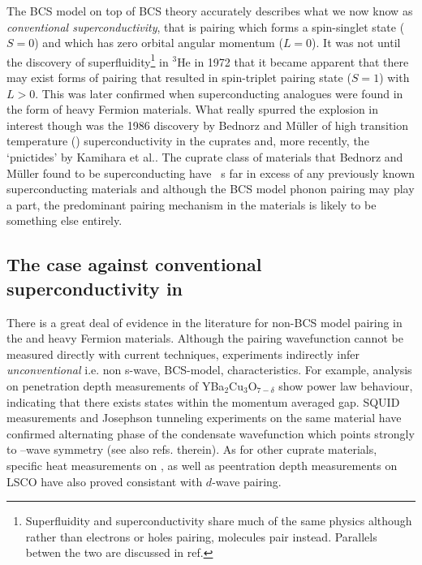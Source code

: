 The BCS model on top of BCS theory accurately describes what we now know as \textit{conventional superconductivity}, that is pairing which forms a spin-singlet state ($S=0$) and which has zero orbital angular momentum ($L=0$). It was not until the discovery of superfluidity\footnote{Superfluidity and superconductivity share much of the same physics although rather than electrons or holes pairing, molecules pair instead. Parallels betwen the two are discussed in ref.\cite{Annett2010}} in $^3$He in 1972\cite{Osheroff1972} that it became apparent that there may exist forms of pairing that resulted in spin-triplet pairing state ($S=1$) with $L>0$. This was later confirmed when superconducting analogues were found in the form of heavy Fermion materials. What really spurred the explosion in interest though was the 1986 discovery by Bednorz and M\"uller\cite{Bednorz} of high transition temperature (\Tc) superconductivity in the cuprates and, more recently, the `pnictides' by Kamihara et al.\cite{Kamihara2008}. The cuprate class of materials that Bednorz and M\"uller found to be superconducting have \Tc~s far in excess of any previously known superconducting materials and although the BCS model phonon pairing may play a part, the predominant pairing mechanism in the \highTc materials is likely to be something else entirely.

\subsection{The case against conventional superconductivity in \highTc}

There is a great deal of evidence in the literature for non-BCS model pairing in the \highTc and heavy Fermion materials. Although the pairing wavefunction cannot be measured directly with current techniques, experiments indirectly infer \textit{unconventional} i.e. non s-wave, BCS-model, characteristics. For example, analysis on penetration depth measurements of YBa$_2$Cu$_3$O$_{7-\delta}$ show power law behaviour\cite{Annett1991}, indicating that there exists states within the momentum averaged gap. SQUID measurements and Josephson tunneling experiments on the same material have confirmed alternating phase of the condensate wavefunction which points strongly to \DxTwoyTwo--wave symmetry\cite{VanHarlingen1994} (see also refs. therein). As for other cuprate materials, specific heat measurements on \BSCO\cite{Wang2011}, as well as peentration depth measurements on LSCO\cite{Froehlich1996} have also proved consistant with $d$-wave pairing. 

